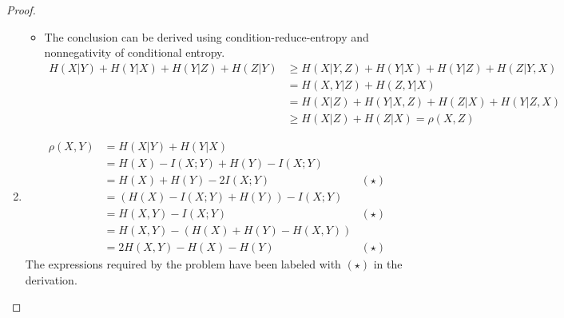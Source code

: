 \begin{exercise}[Metric]
\begin{proof}
\begin{enumerate}
{\begin{itemize}
          On the other hand, if \(\rho(X,Y)= H(X | Y)+H(Y|X)=0\)
          Since $H(X | Y) \geqslant 0 , \quad H(Y(X) \geqslant 0$, we have $H(X | Y) = 0 , \quad H(Y(X) = 0$.
          By the conclusion in Exercise 2, Assignment 1, $X$ and $Y$ are mutually each other's function, i.e.there exists a one-to-one mapping between $X$ and $Y$.
          \item The conclusion can be derived using condition-reduce-entropy and nonnegativity of conditional entropy.
            \begin{equation}\begin{aligned}
            H(X | Y)+H(Y | X)+H(Y|Z)+H(Z | Y) & \geqslant H(X| Y,Z)+H(Y | X )+H(Y | Z)+H(Z | Y,X) \\
            &=H(X, Y | Z)+H(Z, Y | X) \\
            &=H(X | Z)+H(Y | X,Z)+H(Z | X)+H(Y | Z,X) \\
            &\geqslant H(X | Z)+H(Z | X)=\rho(X, Z)
            \end{aligned}\end{equation}
        \end{itemize}
        }
        \item {
          \begin{equation}\begin{aligned}
          \rho(X,Y)&=H(X | Y)+H(Y | X)&\\
          &=H(X)-I(X ; Y)+H(Y)-I(X ; Y) &\\
          &=H(X)+H(Y)-2 I(X ; Y) & (\star)\\
          &=(H(X)-I(X ; Y)+H(Y))-I(X ; Y)& \\
          &=H(X,Y)-I(X ; Y) & (\star)\\
          &=H(X,Y)-(H(X)+H(Y)-H(X,Y)) &\\
          &=2 H(X, Y)-H(X)-H(Y) & (\star)
          \end{aligned}\end{equation}
          The expressions required by the problem have been labeled with $(\star)$ in the derivation.
        }
      \end{enumerate}


  \end{proof}
  \end{exercise}

